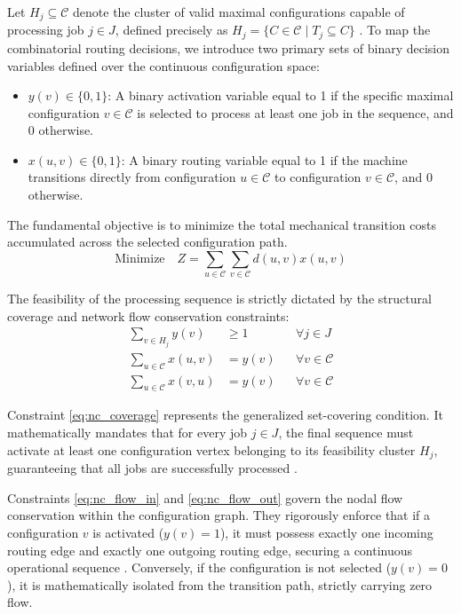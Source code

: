 \documentclass[11pt, a4paper]{book}
\begin{document}
	Let $H_j \subseteq \mathcal{C}$ denote the cluster of valid maximal configurations capable of processing job $j \in J$, defined precisely as $H_j = \{ C \in \mathcal{C} \mid T_j \subseteq C \}$ \cite{Colares2026}. %
	To map the combinatorial routing decisions, we introduce two primary sets of binary decision variables defined over the continuous configuration space:
	\begin{itemize}
		\item $y(v) \in \{0, 1\}$: A binary activation variable equal to 1 if the specific maximal configuration $v \in \mathcal{C}$ is selected to process at least one job in the sequence, and 0 otherwise. %
		\item $x(u, v) \in \{0, 1\}$: A binary routing variable equal to 1 if the machine transitions directly from configuration $u \in \mathcal{C}$ to configuration $v \in \mathcal{C}$, and 0 otherwise. %
	\end{itemize}
	
	The fundamental objective is to minimize the total mechanical transition costs accumulated across the selected configuration path. %
	\begin{equation}
		\text{Minimize} \quad Z = \sum_{u \in \mathcal{C}} \sum_{v \in \mathcal{C}} d(u, v) x(u, v) \label{eq:nc_obj} %
	\end{equation}
	
	The feasibility of the processing sequence is strictly dictated by the structural coverage and network flow conservation constraints:
	\begin{align}
		\sum_{v \in H_j} y(v) & \ge 1 && \forall j \in J \label{eq:nc_coverage} \\ %
		\sum_{u \in \mathcal{C}} x(u, v) & = y(v) && \forall v \in \mathcal{C} \label{eq:nc_flow_in} \\ %
		\sum_{u \in \mathcal{C}} x(v, u) & = y(v) && \forall v \in \mathcal{C} \label{eq:nc_flow_out} %
	\end{align}
	
	Constraint \eqref{eq:nc_coverage} represents the generalized set-covering condition. It mathematically mandates that for every job $j \in J$, the final sequence must activate at least one configuration vertex belonging to its feasibility cluster $H_j$, guaranteeing that all jobs are successfully processed \cite{Colares2026}. %
	
	Constraints \eqref{eq:nc_flow_in} and \eqref{eq:nc_flow_out} govern the nodal flow conservation within the configuration graph. %
	They rigorously enforce that if a configuration $v$ is activated ($y(v) = 1$), it must possess exactly one incoming routing edge and exactly one outgoing routing edge, securing a continuous operational sequence \cite{Colares2026}. %
	Conversely, if the configuration is not selected ($y(v) = 0$), it is mathematically isolated from the transition path, strictly carrying zero flow. %
	
\end{document}
